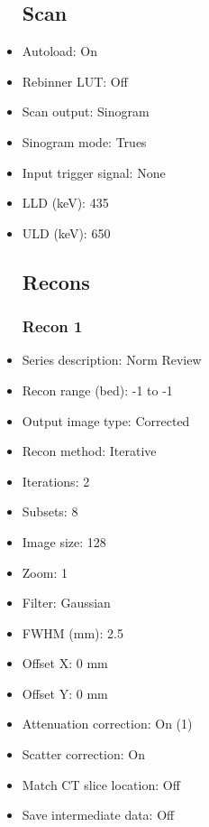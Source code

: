 \documentclass[12pt]{article}
\begin{document}
\begin{itemize}[noitemsep]
\subsection{Scan}
\item Autoload: On
\item Rebinner LUT: Off
\item Scan output: Sinogram
\item Sinogram mode: Trues
\item Input trigger signal: None
\item LLD (keV): 435
\item ULD (keV): 650
\subsection{Recons}
\subsubsection{Recon 1}
\item Series description: Norm Review
\item Recon range (bed): -1 to -1
\item Output image type: Corrected
\item Recon method: Iterative
\item Iterations: 2
\item Subsets: 8
\item Image size: 128
\item Zoom: 1
\item Filter: Gaussian
\item FWHM (mm): 2.5
\item Offset X: 0 mm
\item Offset Y: 0 mm
\item Attenuation correction: On (1)
\item Scatter correction: On
\item Match CT slice location: Off
\item Save intermediate data: Off
\end{itemize}
\end{document}
